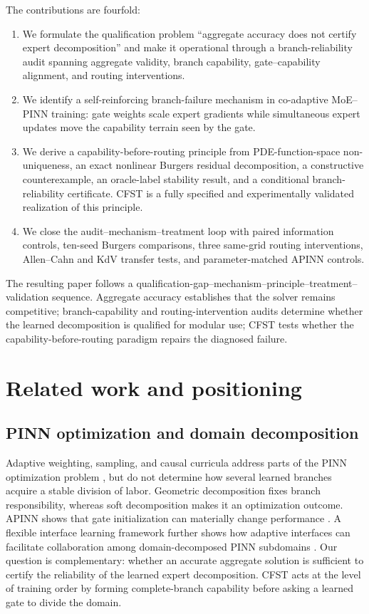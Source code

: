 \documentclass[preprint,12pt]{elsarticle}
\theoremstyle{remark}
\begin{document}
The contributions are fourfold:
\begin{enumerate}
  \item We formulate the qualification problem ``aggregate accuracy does not certify expert decomposition'' and make it operational through a branch-reliability audit spanning aggregate validity, branch capability, gate--capability alignment, and routing interventions.
  \item We identify a self-reinforcing branch-failure mechanism in co-adaptive MoE--PINN training: gate weights scale expert gradients while simultaneous expert updates move the capability terrain seen by the gate.
  \item We derive a capability-before-routing principle from PDE-function-space non-uniqueness, an exact nonlinear Burgers residual decomposition, a constructive counterexample, an oracle-label stability result, and a conditional branch-reliability certificate. CFST is a fully specified and experimentally validated realization of this principle.
  \item We close the audit--mechanism--treatment loop with paired information controls, ten-seed Burgers comparisons, three same-grid routing interventions, Allen--Cahn and KdV transfer tests, and parameter-matched APINN controls.
\end{enumerate}
The resulting paper follows a qualification-gap--mechanism--principle--treatment--validation sequence. Aggregate accuracy establishes that the solver remains competitive; branch-capability and routing-intervention audits determine whether the learned decomposition is qualified for modular use; CFST tests whether the capability-before-routing paradigm repairs the diagnosed failure.

\section{Related work and positioning}
\subsection{PINN optimization and domain decomposition}
Adaptive weighting, sampling, and causal curricula address parts of the PINN optimization problem \cite{mcclenny2023,wu2023,wang2022causal}, but do not determine how several learned branches acquire a stable division of labor. Geometric decomposition fixes branch responsibility, whereas soft decomposition makes it an optimization outcome. APINN shows that gate initialization can materially change performance \cite{hu2023}. A flexible interface learning framework further shows how adaptive interfaces can facilitate collaboration among domain-decomposed PINN subdomains \cite{li2026flexible}. Our question is complementary: whether an accurate aggregate solution is sufficient to certify the reliability of the learned expert decomposition. CFST acts at the level of training order by forming complete-branch capability before asking a learned gate to divide the domain.
\end{document}
